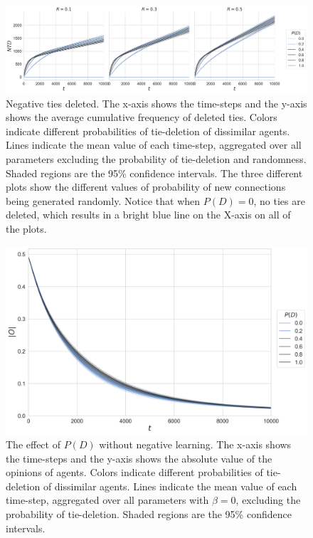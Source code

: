 \documentclass{article}
\begin{document}
\begin{figure}[H]
    \centering
    \includegraphics[width=.9\linewidth]{../plots/overall/Negative_Tie_Deleted.png}
  \caption{Negative ties deleted. The x-axis shows the time-steps and the y-axis shows the average cumulative frequency of deleted ties. Colors indicate different probabilities of tie-deletion of dissimilar agents. Lines indicate the mean value of each time-step, aggregated over all parameters excluding the probability of tie-deletion and randomness. Shaded regions are the 95\% confidence intervals. The three different plots show the different values of probability of new connections being generated randomly. Notice that when $P(D) = 0$, no ties are deleted, which results in a bright blue line on the X-axis on all of the plots.}
  \label{fig:ntd}
\end{figure}

\begin{figure}[H]
    \centering
    \includegraphics[width=.7\linewidth]{../plots/overall/Absolute_Opinion_Tie_Deletion_Without_Negative.png}
  \caption{The effect of $P(D)$ without negative learning. The x-axis shows the time-steps and the y-axis shows the absolute value of the opinions of agents. Colors indicate different probabilities of tie-deletion of dissimilar agents. Lines indicate the mean value of each time-step, aggregated over all parameters with $\beta = 0$, excluding the probability of tie-deletion. Shaded regions are the 95\% confidence intervals.}
  \label{fig:pd_no_negative}
\end{figure}
\end{document}
